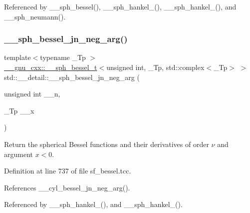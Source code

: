 Referenced by \+\_\+\+\_\+sph\+\_\+bessel(), \+\_\+\+\_\+sph\+\_\+hankel\+\_(), \+\_\+\+\_\+sph\+\_\+hankel\+\_(), and \+\_\+\+\_\+sph\+\_\+neumann().

\mbox{\label{namespacestd_1_1____detail_a8c2a1782e4030a517568aaebecb09f9d}} 
\subsubsection{\texorpdfstring{\+\_\+\+\_\+sph\+\_\+bessel\+\_\+jn\+\_\+neg\+\_\+arg()}{\_\_sph\_bessel\_jn\_neg\_arg()}}
{\footnotesize\ttfamily template$<$typename \+\_\+\+Tp $>$ \\
\hyperlink{struct____gnu__cxx_1_1____sph__bessel__t}{\+\_\+\+\_\+gnu\+\_\+cxx\+::\+\_\+\+\_\+sph\+\_\+bessel\+\_\+t}$<$unsigned int, \+\_\+\+Tp, std\+::complex$<$\+\_\+\+Tp$>$ $>$ std\+::\+\_\+\+\_\+detail\+::\+\_\+\+\_\+sph\+\_\+bessel\+\_\+jn\+\_\+neg\+\_\+arg (\begin{DoxyParamCaption}\item[{unsigned int}]{\+\_\+\+\_\+n,  }\item[{\+\_\+\+Tp}]{\+\_\+\+\_\+x }\end{DoxyParamCaption})}

Return the spherical Bessel functions and their derivatives of order $ \nu $ and argument $ x < 0 $. 

Definition at line 737 of file sf\+\_\+bessel.\+tcc.



References \+\_\+\+\_\+cyl\+\_\+bessel\+\_\+jn\+\_\+neg\+\_\+arg().



Referenced by \+\_\+\+\_\+sph\+\_\+hankel\+\_(), and \+\_\+\+\_\+sph\+\_\+hankel\+\_().

\mbox{\label{namespacestd_1_1____detail_a1babbc6df4e260ad0e828044c9f33ca1}} 
